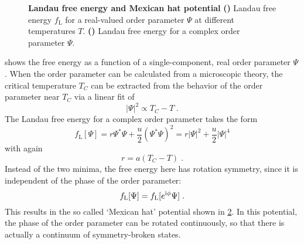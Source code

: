 \documentclass[../notes.tex]{subfiles}
\begin{document}
\begin{figure}[t]
	\centering
	\begin{subfigure}[b]{0.5\textwidth}
		\centering
		\caption{\hfill\null}\label{sfig:Landau free energy}
		
	\end{subfigure}%
	\begin{subfigure}[b]{0.5\textwidth}
		\centering
		\caption{\hfill\null}\label{sfig:Ginzburg Landau free energy}
		
	\end{subfigure}
	\caption{
		\textbf{Landau free energy and Mexican hat potential} \textbf{()} Landau free energy \(f_{\mathrm{L}}\) for a real-valued order parameter \(\Psi\) at different temperatures \(T\). \textbf{()} Landau free energy for a complex order parameter \(\Psi\).
	} 
	\label{fig:Landau free energy and Ginzburg-Landau free energy}
\end{figure}

 shows the free energy as a function of a single-component, real order parameter \(\Psi\).
When the order parameter can be calculated from a microscopic theory, the critical temperature \(T_C\) can be extracted from the behavior of the order parameter near \(T_C\) via a linear fit of
\begin{equation}
	\vert \Psi \vert^2 \propto T_C - T \;.
	\label{eq:extract T_C via OP}
\end{equation}
The Landau free energy for a complex order parameter takes the form
\begin{equation}
	f_{\mathrm{L}} [\Psi] = r \Psi^* \Psi + \frac{u}{2} (\Psi^* \Psi)^2 = r \vert \Psi \vert^2 + \frac{u}{2} \vert \Psi \vert^4
\end{equation}
with again
\begin{equation}
	r = a(T_C - T) \;.
\end{equation}
Instead of the two minima, the free energy here has rotation symmetry, since it is independent of the phase of the order parameter: 
\begin{equation}
	f_{\mathrm{L}} [\Psi] = f_{\mathrm{L}} [e^{\mathrm{i} \phi} \Psi] \;.
\end{equation}
This results in the so called `Mexican hat' potential shown in \cref{sfig:Ginzburg Landau free energy}.
In this potential, the phase of the order parameter can be rotated continuously, so that there is actually a continuum of symmetry-broken states.
\end{document}
